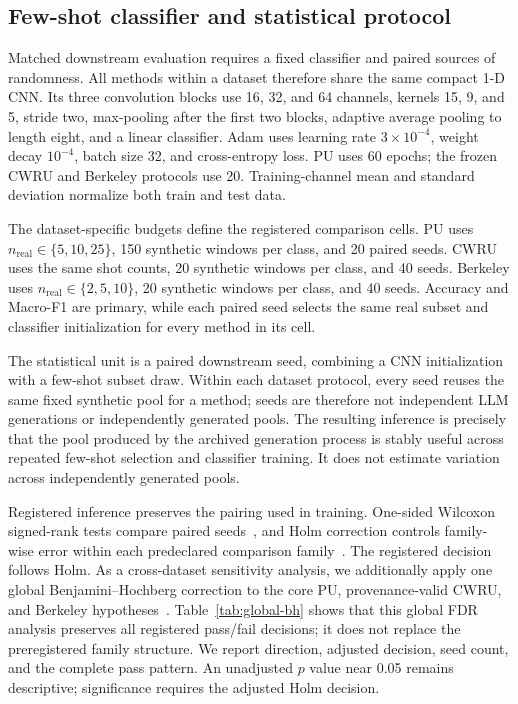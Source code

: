 \documentclass[a4paper,fleqn]{cas-sc}
\begin{document}
\subsection{Few-shot classifier and statistical protocol}

Matched downstream evaluation requires a fixed classifier and paired sources of
randomness. All methods within a dataset therefore share the same compact 1-D
CNN. Its three convolution blocks use 16, 32, and 64 channels, kernels 15, 9,
and 5, stride two, max-pooling after the first two blocks, adaptive average
pooling to length eight, and a linear classifier. Adam uses learning rate
$3\times10^{-4}$, weight decay $10^{-4}$, batch size 32, and cross-entropy
loss. PU uses 60 epochs; the frozen CWRU and Berkeley protocols use 20.
Training-channel mean and standard deviation normalize both train and test
data.

The dataset-specific budgets define the registered comparison cells. PU uses
$n_{\mathrm{real}}\in\{5,10,25\}$, 150 synthetic windows per class, and 20
paired seeds. CWRU uses the same shot counts, 20 synthetic windows per class,
and 40 seeds. Berkeley uses $n_{\mathrm{real}}\in\{2,5,10\}$, 20 synthetic
windows per class, and 40 seeds. Accuracy and Macro-F1 are primary, while each
paired seed selects the same real subset and classifier initialization for
every method in its cell.

The statistical unit is a paired downstream seed, combining a CNN
initialization with a few-shot subset draw. Within each dataset protocol, every
seed reuses the same fixed synthetic pool for a method; seeds are therefore not
independent LLM generations or independently generated pools. The resulting
inference is precisely that the pool produced by the archived generation
process is stably useful across repeated few-shot selection and classifier
training. It does not estimate variation across independently generated pools.

Registered inference preserves the pairing used in training. One-sided
Wilcoxon signed-rank tests compare paired seeds~\citep{wilcoxon1945paired}, and
Holm correction controls family-wise error within each predeclared comparison
family~\citep{holm1979multiple}. The registered decision follows Holm. As a
cross-dataset sensitivity analysis, we additionally apply one global
Benjamini--Hochberg correction to the \BreezeGlobalCoreHypotheses{} core PU,
provenance-valid CWRU, and
Berkeley hypotheses~\citep{benjamini1995fdr}. Table~\ref{tab:global-bh} shows
that this global FDR analysis preserves all
\BreezeGlobalDecisionAgreement{} registered pass/fail decisions;
it does not replace the preregistered family structure. We report direction,
adjusted decision, seed count, and the complete pass pattern. An unadjusted
$p$ value near 0.05 remains descriptive; significance requires the adjusted
Holm decision.
\end{document}
